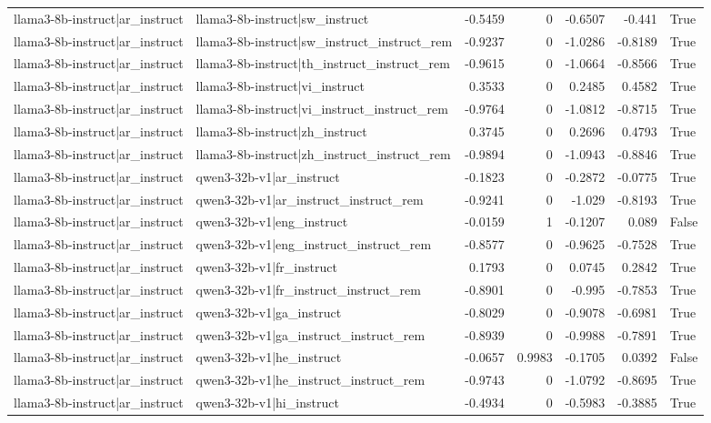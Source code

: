 \begin{table}
\begin{tabular}{l l r r r r l}
llama3-8b-instruct|ar_instruct & llama3-8b-instruct|sw_instruct & -0.5459 & 0 & -0.6507 & -0.441 & True \\
llama3-8b-instruct|ar_instruct & llama3-8b-instruct|sw_instruct_instruct_rem & -0.9237 & 0 & -1.0286 & -0.8189 & True \\
llama3-8b-instruct|ar_instruct & llama3-8b-instruct|th_instruct_instruct_rem & -0.9615 & 0 & -1.0664 & -0.8566 & True \\
llama3-8b-instruct|ar_instruct & llama3-8b-instruct|vi_instruct & 0.3533 & 0 & 0.2485 & 0.4582 & True \\
llama3-8b-instruct|ar_instruct & llama3-8b-instruct|vi_instruct_instruct_rem & -0.9764 & 0 & -1.0812 & -0.8715 & True \\
llama3-8b-instruct|ar_instruct & llama3-8b-instruct|zh_instruct & 0.3745 & 0 & 0.2696 & 0.4793 & True \\
llama3-8b-instruct|ar_instruct & llama3-8b-instruct|zh_instruct_instruct_rem & -0.9894 & 0 & -1.0943 & -0.8846 & True \\
llama3-8b-instruct|ar_instruct & qwen3-32b-v1|ar_instruct & -0.1823 & 0 & -0.2872 & -0.0775 & True \\
llama3-8b-instruct|ar_instruct & qwen3-32b-v1|ar_instruct_instruct_rem & -0.9241 & 0 & -1.029 & -0.8193 & True \\
llama3-8b-instruct|ar_instruct & qwen3-32b-v1|eng_instruct & -0.0159 & 1 & -0.1207 & 0.089 & False \\
llama3-8b-instruct|ar_instruct & qwen3-32b-v1|eng_instruct_instruct_rem & -0.8577 & 0 & -0.9625 & -0.7528 & True \\
llama3-8b-instruct|ar_instruct & qwen3-32b-v1|fr_instruct & 0.1793 & 0 & 0.0745 & 0.2842 & True \\
llama3-8b-instruct|ar_instruct & qwen3-32b-v1|fr_instruct_instruct_rem & -0.8901 & 0 & -0.995 & -0.7853 & True \\
llama3-8b-instruct|ar_instruct & qwen3-32b-v1|ga_instruct & -0.8029 & 0 & -0.9078 & -0.6981 & True \\
llama3-8b-instruct|ar_instruct & qwen3-32b-v1|ga_instruct_instruct_rem & -0.8939 & 0 & -0.9988 & -0.7891 & True \\
llama3-8b-instruct|ar_instruct & qwen3-32b-v1|he_instruct & -0.0657 & 0.9983 & -0.1705 & 0.0392 & False \\
llama3-8b-instruct|ar_instruct & qwen3-32b-v1|he_instruct_instruct_rem & -0.9743 & 0 & -1.0792 & -0.8695 & True \\
llama3-8b-instruct|ar_instruct & qwen3-32b-v1|hi_instruct & -0.4934 & 0 & -0.5983 & -0.3885 & True \\

\end{tabular}
\end{table}
